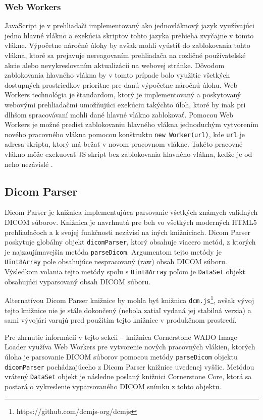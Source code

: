 \subsubsection {Web Workers}
JavaScript je v prehliadači implementovaný ako jednovláknový jazyk využívajúci jedno hlavné vlákno a exekúcia skriptov tohto jazyka prebieha zvyčajne v tomto vlákne. Výpočetne náročné úlohy by avšak mohli vyústiť do zablokovania tohto vlákna, ktoré sa prejavuje nereagovaním prehliadača na rozličné používateľské akcie alebo nevykreslovaním aktualizácií na webovej stránke. Dôvodom zablokovania hlavného vlákna by v tomto prípade bolo využitie všetkých dostupných prostriedkov prioritne pre danú výpočetne náročnú úlohu. \newline
Web Workers technológia je štandardom, ktorý je implementovaný a poskytovaný webovými prehliadačmi umožňujúci exekúciu takýchto úloh, ktoré by inak pri dlhšom spracovávaní mohli dané hlavné vlákno zablokovať. Pomocou Web Workers je možné predísť zablokovaniu hlavného vlákna jednoduchým vytvorením nového pracovného vlákna pomocou konštruktu \texttt{new Worker(url)}, kde \texttt{url} je adresa skriptu, ktorý má bežať v novom pracovnom vlákne. Takéto pracovné vlákno môže exekuovať JS skript bez zablokovania hlavného vlákna, keďže je od neho nezávislé \cite{using_web_workers}.

\subsection {Dicom Parser}
Dicom Parser je knižnica implementujúca parsovanie všetkých známych validných DICOM súborov. Knižnica je navrhnutá pre beh vo všetkých moderných HTML5 prehliadačoch a k svojej funkčnosti nezávisí na iných knižniciach. Dicom Parser poskytuje globálny objekt \texttt{dicomParser}, ktorý obsahuje viacero metód, z ktorých je najzaujímavejšia metóda \texttt{parseDicom}. Argumentom tejto metódy je \texttt{Uint8Array} pole obsahujúce nespracovaný (raw) obsah DICOM súboru. Výsledkom volania tejto metódy spolu s \texttt{Uint8Array} poľom je \texttt{DataSet} objekt obsahujúci vyparsovaný obsah DICOM súboru.

Alternatívou Dicom Parser knižnice by mohla byť knižnica \texttt{dcm.js}\footnote{https://github.com/dcmjs-org/dcmjs}, avšak vývoj tejto knižnice nie je stále dokončený (nebola zatiaľ vydaná jej stabilná verzia) a sami vývojári varujú pred použitím tejto knižnice v produkčnom prostredí. 

Pre zhrnutie informácií v tejto sekcii -- knižnica Cornerstone WADO Image Loader využíva Web Workers pre vytvorenie nových pracovných vlákien, ktorých úloha je parsovanie DICOM súborov pomocou metódy \texttt{parseDicom} objektu \texttt{dicomParser} pochádzajúceho z Dicom Parser knižnice uvedenej vyššie. Metódou vrátený \texttt{DataSet} objekt je následne poslaný knižnici Cornerstone Core, ktorá sa postará o vykreslenie vyparsovaného DICOM snímku z tohto objektu.

